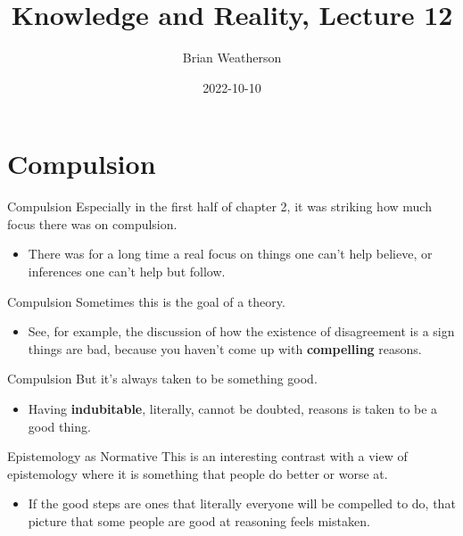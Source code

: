 \documentclass[
  17pt,
  letterpaper,
  ignorenonframetext,
  aspectratio=169,
]{beamer}
\title{Knowledge and Reality, Lecture 12}
\author{Brian Weatherson}
\date{2022-10-10}
\providecommand{\tightlist}{%
  \setlength{\itemsep}{0pt}\setlength{\parskip}{0pt}}\usepackage{longtable,booktabs,array}
\begin{document}
\frame{\titlepage}
\ifdefined\Shaded\renewenvironment{Shaded}{\begin{tcolorbox}[boxrule=0pt, interior hidden, enhanced, breakable, frame hidden, sharp corners, borderline west={3pt}{0pt}{shadecolor}]}{\end{tcolorbox}}\fi

\hypertarget{compulsion}{%
\section{Compulsion}\label{compulsion}}

\begin{frame}{Compulsion}
\protect\hypertarget{compulsion-1}{}
Especially in the first half of chapter 2, it was striking how much
focus there was on compulsion.

\begin{itemize}[<+->]
\tightlist
\item
  There was for a long time a real focus on things one can't help
  believe, or inferences one can't help but follow.
\end{itemize}
\end{frame}

\begin{frame}{Compulsion}
\protect\hypertarget{compulsion-2}{}
Sometimes this is the goal of a theory.

\begin{itemize}[<+->]
\tightlist
\item
  See, for example, the discussion of how the existence of disagreement
  is a sign things are bad, because you haven't come up with
  \textbf{compelling} reasons.
\end{itemize}
\end{frame}

\begin{frame}{Compulsion}
\protect\hypertarget{compulsion-3}{}
But it's always taken to be something good.

\begin{itemize}[<+->]
\tightlist
\item
  Having \textbf{indubitable}, literally, cannot be doubted, reasons is
  taken to be a good thing.
\end{itemize}
\end{frame}

\begin{frame}{Epistemology as Normative}
\protect\hypertarget{epistemology-as-normative}{}
This is an interesting contrast with a view of epistemology where it is
something that people do better or worse at.

\begin{itemize}[<+->]
\tightlist
\item
  If the good steps are ones that literally everyone will be compelled
  to do, that picture that some people are good at reasoning feels
  mistaken.
\end{itemize}
\end{frame}
\end{document}
